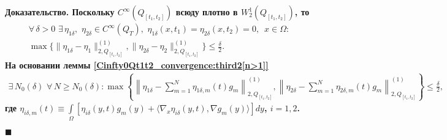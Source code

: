 \documentclass{report}
\newenvironment{Proof}{\par\noindent\bf Доказательство.\rm}{ $\blacksquare$\par}
\begin{document}
\begin{Proof}
Поскольку $C^\infty(Q_{[t_1,t_2]})$ всюду плотно в $W^1_{2}(Q_{[t_1,t_2]})$, то
\begin{gather*}
\forall\,\delta>0\,\,\exists\,\eta_{1\delta},\,\,\eta_{2\delta}\in C^{\infty}(Q_T),\,\,\eta_{1\delta}(x,t_1)=\eta_{2\delta}(x,t_2)=0,\,\,\,x\in\Omega:\\
\max\{\|\eta_{1\delta}-\eta_1\|^{(1)}_{2,Q_{[t_1,t_2]}},\|\eta_{2\delta}-\eta_2\|^{(1)}_{2,Q_{[t_1,t_2]}}\} \leqslant\frac{\delta}{2}.
\end{gather*}
На основании леммы \ref{Cinfty0Qt1t2_convergence:third2[n>1]}
\begin{gather*}
\exists\,N_0(\delta)\,\,\forall\,N\geqslant N_0(\delta):\max\left\{\left\|\eta_{1\delta}-\sum\limits_{m=1}^N\eta_{1\delta,m}(t)g_m\right\|^{(1)}_{2,Q_{[t_1,t_2]}},
\left\|\eta_{2\delta}-\sum\limits_{m=1}^N\eta_{2\delta,m}(t)g_m\right\|^{(1)}_{2,Q_{[t_1,t_2]}}\right\}\leqslant\frac{\delta}{2},
\end{gather*}
где $\eta_{i\delta,m}(t)\equiv\int\limits_{\Omega}[\eta_{i\delta}(y,t)g_m(y)+ \langle\nabla_x\eta_{i\delta}(y,t),\nabla g_m(y)\rangle]dy$, $i=1,2$.


\end{Proof}
\end{document}
